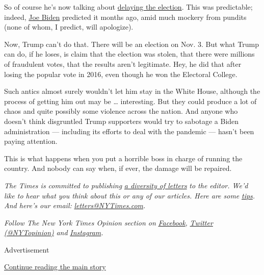 So of course he's now talking about
\href{https://www.washingtonpost.com/politics/trump-floats-idea-of-delaying-the-november-election-as-he-ramps-up-attacks-on-voting-by-mail/2020/07/30/15fe7ac6-d264-11ea-9038-af089b63ac21_story.html?hpid=hp_hp-top-table-main_trumpelection-920am\%3Ahomepage\%2Fstory-ans}{delaying
the election}. This was predictable; indeed,
\href{https://www.usatoday.com/story/news/politics/2020/04/24/joe-biden-says-trump-try-kick-back-election-november/3018352001/}{Joe
Biden} predicted it months ago, amid much mockery from pundits (none of
whom, I predict, will apologize).

Now, Trump can't do that. There will be an election on Nov. 3. But what
Trump can do, if he loses, is claim that the election was stolen, that
there were millions of fraudulent votes, that the results aren't
legitimate. Hey, he did that after losing the popular vote in 2016, even
though he won the Electoral College.

Such antics almost surely wouldn't let him stay in the White House,
although the process of getting him out may be \ldots{} interesting. But
they could produce a lot of chaos and quite possibly some violence
across the nation. And anyone who doesn't think disgruntled Trump
supporters would try to sabotage a Biden administration --- including
its efforts to deal with the pandemic --- hasn't been paying attention.

This is what happens when you put a horrible boss in charge of running
the country. And nobody can say when, if ever, the damage will be
repaired.

\emph{The Times is committed to publishing}
\href{https://www.nytimes3xbfgragh.onion/2019/01/31/opinion/letters/letters-to-editor-new-york-times-women.html}{\emph{a
diversity of letters}} \emph{to the editor. We'd like to hear what you
think about this or any of our articles. Here are some}
\href{https://help.nytimes3xbfgragh.onion/hc/en-us/articles/115014925288-How-to-submit-a-letter-to-the-editor}{\emph{tips}}\emph{.
And here's our email:}
\href{mailto:letters@NYTimes.com}{\emph{letters@NYTimes.com}}\emph{.}

\emph{Follow The New York Times Opinion section on}
\href{https://www.facebookcorewwwi.onion/nytopinion}{\emph{Facebook}}\emph{,}
\href{http://twitter.com/NYTOpinion}{\emph{Twitter (@NYTopinion)}}
\emph{and}
\href{https://www.instagram.com/nytopinion/}{\emph{Instagram}}\emph{.}

Advertisement

\protect\hyperlink{after-bottom}{Continue reading the main story}

